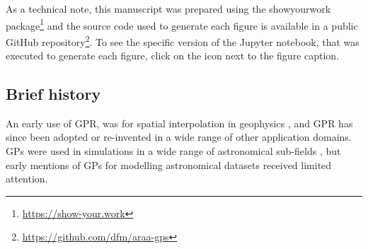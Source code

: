 \documentclass[letterpaper]{ar-1col}
\newcommand{\project}[1]{\textsf{#1}}
\begin{document}

As a technical note, this manuscript was prepared using the \project{showyourwork} package\footnote{\url{https://show-your.work}} and the source code used to generate each figure is available in a public \project{GitHub} repository\footnote{\url{https://github.com/dfm/araa-gps}}.
To see the specific version of the \project{Jupyter} notebook, that was executed to generate each figure, click on the icon next to the figure caption.

\subsection{Brief history}

An early use of GPR, was for spatial interpolation in geophysics \citep{kriging}, and GPR has since been adopted or re-invented in a wide range of other application domains. GPs were used in simulations in a wide range of astronomical sub-fields \citep[see e.g.][]{1980asfr.symp..159B,1988JGR....9311569C,1997ApJ...483L...1P}, but early mentions of GPs for modelling astronomical datasets \citep[see e.g.][]{1976MitAG..38..192D,1978A&A....70..777V,1991MGeo...16..313J} received limited attention.
\end{document}
